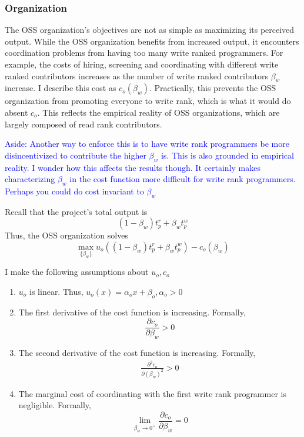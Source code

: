 \documentclass[../main.tex]{subfiles}
\begin{document}
\subsubsection{Organization}
The OSS organization's objectives are not as simple as maximizing its perceived output. While the OSS organization benefits from increased output, it encounters coordination problems from having too many write ranked programmers. For example, the costs of hiring, screening and coordinating with different write ranked contributors increases as the number of write ranked contributors $\beta_w$ increase. I describe this cost as $c_o(\beta_w)$. Practically, this prevents the OSS organization from promoting everyone to write rank, which is what it would do absent $c_o$. This reflects the empirical reality of OSS organizations, which are largely composed of read rank contributors. 

\textcolor{blue}{Aside: Another way to enforce this is to have write rank programmers be more disincentivized to contribute the higher $\beta_w$ is. This is also grounded in empirical reality. I wonder how this affects the results though. It certainly makes characterizing $\beta_w$ in the cost function more difficult for write rank programmers. Perhaps you could do cost invariant to $\beta_w$}

\qquad Recall that the project's total output is 
$$(1-\beta_w) t_p^r + \beta_w t_p^w$$
Thus, the OSS organization solves
$$\max_{\{\beta_w\}} u_o\left((1-\beta_w) t_p^r + \beta_w t_p^w\right) - c_o(\beta_w)$$ 

I make the following assumptions about $u_o, c_o$
\begin{enumerate}
    \item $u_o$ is linear. Thus, $u_o(x) = \alpha_ox + \beta_o, \alpha_o > 0$
    \item The first derivative of the cost function is increasing. Formally, 
    $$\frac{\partial c_o}{\partial \beta_w}>0$$
    \item  The second derivative of the cost function is increasing. Formally, 
    \begin{align}
        \frac{\partial^2 c_o}{\partial (\beta_w)^2}>0 \label{org_concave_cost}
    \end{align}
    \item The marginal cost of coordinating with the first write rank programmer is negligible. Formally,
    $$\lim_{\beta_w \to 0^+} \frac{\partial c_o}{\partial \beta_w} = 0 $$
\end{enumerate}
\end{document}
